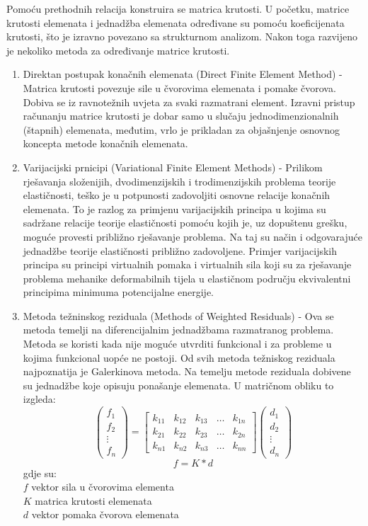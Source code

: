 \documentclass[a4paper,twoside,12pt]{memoir} %
\begin{document}
Pomoću prethodnih relacija konstruira se matrica krutosti. U početku, matrice krutosti elemenata i jednadžba elemenata određivane su pomoću koeficijenata krutosti, što je izravno povezano sa strukturnom analizom. Nakon toga razvijeno je nekoliko metoda za određivanje matrice krutosti.
\begin{enumerate}
    \item Direktan postupak konačnih elemenata (Direct Finite Element Method) -
    Matrica krutosti povezuje sile u čvorovima elemenata i pomake čvorova. Dobiva se iz ravnotežnih uvjeta za svaki razmatrani element. Izravni pristup računanju matrice krutosti je dobar samo u slučaju jednodimenzionalnih (štapnih) elemenata, međutim, vrlo je prikladan za objašnjenje osnovnog koncepta metode konačnih elemenata.
    
    \item Varijacijski prnicipi (Variational Finite Element Methods) -
    Prilikom rješavanja složenijih, dvodimenzijskih i trodimenzijskih problema teorije elastičnosti, teško je u potpunosti zadovoljiti osnovne relacije konačnih elemenata. To je razlog za primjenu varijacijskih principa u kojima su sadržane relacije teorije elastičnosti pomoću kojih je, uz dopuštenu grešku, moguće provesti približno rješavanje problema. Na taj su način i odgovarajuće jednadžbe teorije elastičnosti približno zadovoljene. Primjer varijacijskih principa su principi virtualnih pomaka i virtualnih sila koji su za rješavanje problema mehanike deformabilnih tijela u elastičnom području ekvivalentni principima minimuma potencijalne energije.
    
    \item Metoda težninskog reziduala (Methods of Weighted Residuals) -
    Ova se metoda temelji na diferencijalnim jednadžbama razmatranog problema. Metoda se koristi kada nije moguće utvrditi funkcional i za probleme u kojima funkcional uopće ne postoji. Od svih metoda težniskog reziduala najpoznatija je Galerkinova metoda. Na temelju metode reziduala dobivene su jednadžbe koje opisuju ponašanje elemenata. U matričnom obliku to izgleda:
    $$
    \begin{pmatrix} f_1 \\ f_2 \\ \vdots \\ f_n \end{pmatrix}
    =
    \begin{bmatrix}
    k_{11}       & k_{12} & k_{13} & \dots & k_{1n} \\
    k_{21}       & k_{22} & k_{23} & \dots & k_{2n} \\
    k_{n1}       & k_{n2} & k_{n3} & \dots & k_{nn}
    \end{bmatrix} 
    \begin{pmatrix} d_1 \\ d_2 \\ \vdots \\ d_n \end{pmatrix}
    $$
    $$ f = K * d $$
    gdje su: \\
    $f$ vektor sila u čvorovima elementa \\
    $K$ matrica krutosti elemenata \\
    $d$ vektor pomaka čvorova elemenata 
\end{enumerate}
\end{document}

